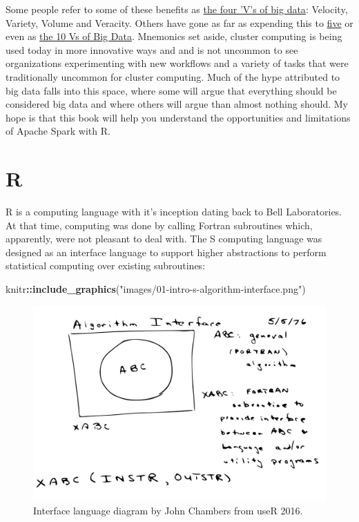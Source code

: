 \documentclass[]{book}
\newenvironment{Shaded}{\begin{snugshade}}{\end{snugshade}}
\newcommand{\KeywordTok}[1]{\textcolor[rgb]{0.13,0.29,0.53}{\textbf{#1}}}
\newcommand{\NormalTok}[1]{#1}
\newcommand{\OperatorTok}[1]{\textcolor[rgb]{0.81,0.36,0.00}{\textbf{#1}}}
\newcommand{\StringTok}[1]{\textcolor[rgb]{0.31,0.60,0.02}{#1}}
\theoremstyle{definition}
\theoremstyle{definition}
\theoremstyle{definition}
\theoremstyle{remark}
\begin{document}
Some people refer to some of these benefits as
\href{http://www.theserverside.com/feature/Handling-the-four-Vs-of-big-data-volume-velocity-variety-and-veracity}{the
four 'V's of big data}: Velocity, Variety, Volume and Veracity. Others
have gone as far as expending this to
\href{https://en.wikipedia.org/wiki/Big_data}{five} or even as
\href{https://tdwi.org/articles/2017/02/08/10-vs-of-big-data.aspx}{the
10 Vs of Big Data}. Mnemonics set aside, cluster computing is being used
today in more innovative ways and and is not uncommon to see
organizations experimenting with new workflows and a variety of tasks
that were traditionally uncommon for cluster computing. Much of the hype
attributed to big data falls into this space, where some will argue that
everything should be considered big data and where others will argue
than almost nothing should. My hope is that this book will help you
understand the opportunities and limitations of Apache Spark with R.

\hypertarget{r}{%
\section{R}\label{r}}

R is a computing language with it's inception dating back to Bell
Laboratories. At that time, computing was done by calling Fortran
subroutines which, apparently, were not pleasant to deal with. The S
computing language was designed as an interface language to support
higher abstractions to perform statistical computing over existing
subroutines:

\begin{Shaded}
\begin{Highlighting}[]
\NormalTok{knitr}\OperatorTok{::}\KeywordTok{include_graphics}\NormalTok{(}\StringTok{"images/01-intro-s-algorithm-interface.png"}\NormalTok{)}
\end{Highlighting}
\end{Shaded}

\begin{figure}
\includegraphics[width=22.22in]{images/01-intro-s-algorithm-interface} \caption{Interface language diagram by John Chambers from useR 2016.}\label{fig:s-diagram}
\end{figure}
\end{document}
